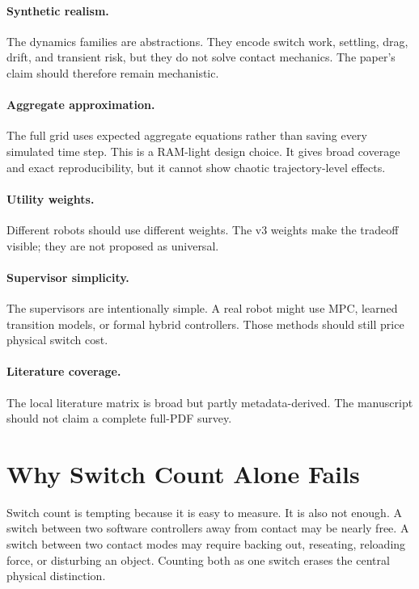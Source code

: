 \documentclass{article}
\begin{document}
\paragraph{Synthetic realism.}
The dynamics families are abstractions.
They encode switch work, settling, drag, drift, and transient risk, but they do not solve contact mechanics.
The paper's claim should therefore remain mechanistic.

\paragraph{Aggregate approximation.}
The full grid uses expected aggregate equations rather than saving every simulated time step.
This is a RAM-light design choice.
It gives broad coverage and exact reproducibility, but it cannot show chaotic trajectory-level effects.

\paragraph{Utility weights.}
Different robots should use different weights.
The v3 weights make the tradeoff visible; they are not proposed as universal.

\paragraph{Supervisor simplicity.}
The supervisors are intentionally simple.
A real robot might use MPC, learned transition models, or formal hybrid controllers.
Those methods should still price physical switch cost.

\paragraph{Literature coverage.}
The local literature matrix is broad but partly metadata-derived.
The manuscript should not claim a complete full-PDF survey.

\section{Why Switch Count Alone Fails}

Switch count is tempting because it is easy to measure.
It is also not enough.
A switch between two software controllers away from contact may be nearly free.
A switch between two contact modes may require backing out, reseating, reloading force, or disturbing an object.
Counting both as one switch erases the central physical distinction.
\end{document}
